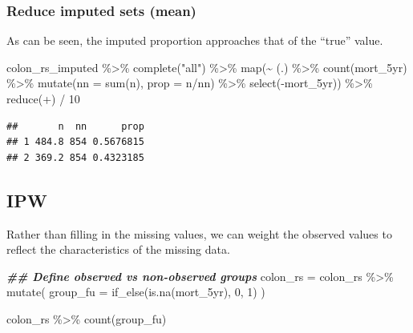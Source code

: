 \documentclass[
]{book}
\newenvironment{Shaded}{\begin{snugshade}}{\end{snugshade}}
\newcommand{\AttributeTok}[1]{\textcolor[rgb]{0.77,0.63,0.00}{#1}}
\newcommand{\DecValTok}[1]{\textcolor[rgb]{0.00,0.00,0.81}{#1}}
\newcommand{\DocumentationTok}[1]{\textcolor[rgb]{0.56,0.35,0.01}{\textbf{\textit{#1}}}}
\newcommand{\FunctionTok}[1]{\textcolor[rgb]{0.00,0.00,0.00}{#1}}
\newcommand{\NormalTok}[1]{#1}
\newcommand{\OtherTok}[1]{\textcolor[rgb]{0.56,0.35,0.01}{#1}}
\newcommand{\SpecialCharTok}[1]{\textcolor[rgb]{0.00,0.00,0.00}{#1}}
\newcommand{\StringTok}[1]{\textcolor[rgb]{0.31,0.60,0.02}{#1}}
\begin{document}
\hypertarget{reduce-imputed-sets-mean}{%
\subsubsection{Reduce imputed sets (mean)}\label{reduce-imputed-sets-mean}}

As can be seen, the imputed proportion approaches that of the ``true'' value.

\begin{Shaded}
\begin{Highlighting}[]
\NormalTok{colon\_rs\_imputed }\SpecialCharTok{\%\textgreater{}\%} 
  \FunctionTok{complete}\NormalTok{(}\StringTok{"all"}\NormalTok{) }\SpecialCharTok{\%\textgreater{}\%} 
  \FunctionTok{map}\NormalTok{(}\SpecialCharTok{\textasciitilde{}}\NormalTok{ (.) }\SpecialCharTok{\%\textgreater{}\%} \FunctionTok{count}\NormalTok{(mort\_5yr) }\SpecialCharTok{\%\textgreater{}\%} 
        \FunctionTok{mutate}\NormalTok{(}\AttributeTok{nn =} \FunctionTok{sum}\NormalTok{(n),}
               \AttributeTok{prop =}\NormalTok{ n}\SpecialCharTok{/}\NormalTok{nn) }\SpecialCharTok{\%\textgreater{}\%} 
        \FunctionTok{select}\NormalTok{(}\SpecialCharTok{{-}}\NormalTok{mort\_5yr)) }\SpecialCharTok{\%\textgreater{}\%} 
  \FunctionTok{reduce}\NormalTok{(}\StringTok{\textasciigrave{}}\AttributeTok{+}\StringTok{\textasciigrave{}}\NormalTok{) }\SpecialCharTok{/} \DecValTok{10}
\end{Highlighting}
\end{Shaded}

\begin{verbatim}
##       n  nn      prop
## 1 484.8 854 0.5676815
## 2 369.2 854 0.4323185
\end{verbatim}

\hypertarget{ipw}{%
\subsection{IPW}\label{ipw}}

Rather than filling in the missing values, we can weight the observed values to reflect the characteristics of the missing data.

\begin{Shaded}
\begin{Highlighting}[]
\DocumentationTok{\#\# Define observed vs non{-}observed groups}
\NormalTok{colon\_rs }\OtherTok{=}\NormalTok{ colon\_rs }\SpecialCharTok{\%\textgreater{}\%} 
  \FunctionTok{mutate}\NormalTok{(}
    \AttributeTok{group\_fu =} \FunctionTok{if\_else}\NormalTok{(}\FunctionTok{is.na}\NormalTok{(mort\_5yr), }\DecValTok{0}\NormalTok{, }\DecValTok{1}\NormalTok{)}
\NormalTok{  )}

\NormalTok{colon\_rs }\SpecialCharTok{\%\textgreater{}\%} 
  \FunctionTok{count}\NormalTok{(group\_fu)}
\end{Highlighting}
\end{Shaded}
\end{document}
